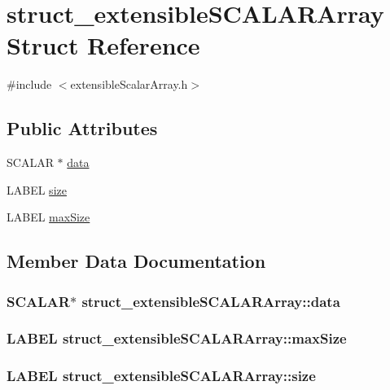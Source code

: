 \hypertarget{structstruct__extensibleSCALARArray}{
\section{struct\_\-extensibleSCALARArray Struct Reference}
\label{structstruct__extensibleSCALARArray}
}


{\ttfamily \#include $<$extensibleScalarArray.h$>$}\subsection*{Public Attributes}
\begin{DoxyCompactItemize}
\item 
SCALAR $\ast$ \hyperlink{structstruct__extensibleSCALARArray_a76de62021f5746ac50dd0d5dca352b60}{data}
\item 
LABEL \hyperlink{structstruct__extensibleSCALARArray_a0d7d05f50a987b37a28b75254f475216}{size}
\item 
LABEL \hyperlink{structstruct__extensibleSCALARArray_a79a03fc7a35e1e94b46a04c6b04d0c87}{maxSize}
\end{DoxyCompactItemize}


\subsection{Member Data Documentation}
\hypertarget{structstruct__extensibleSCALARArray_a76de62021f5746ac50dd0d5dca352b60}{
\subsubsection[{data}]{\setlength{\rightskip}{0pt plus 5cm}SCALAR$\ast$ {\bf struct\_\-extensibleSCALARArray::data}}}
\label{structstruct__extensibleSCALARArray_a76de62021f5746ac50dd0d5dca352b60}
\hypertarget{structstruct__extensibleSCALARArray_a79a03fc7a35e1e94b46a04c6b04d0c87}{
\subsubsection[{maxSize}]{\setlength{\rightskip}{0pt plus 5cm}LABEL {\bf struct\_\-extensibleSCALARArray::maxSize}}}
\label{structstruct__extensibleSCALARArray_a79a03fc7a35e1e94b46a04c6b04d0c87}
\hypertarget{structstruct__extensibleSCALARArray_a0d7d05f50a987b37a28b75254f475216}{
\subsubsection[{size}]{\setlength{\rightskip}{0pt plus 5cm}LABEL {\bf struct\_\-extensibleSCALARArray::size}}}
\label{structstruct__extensibleSCALARArray_a0d7d05f50a987b37a28b75254f475216}


